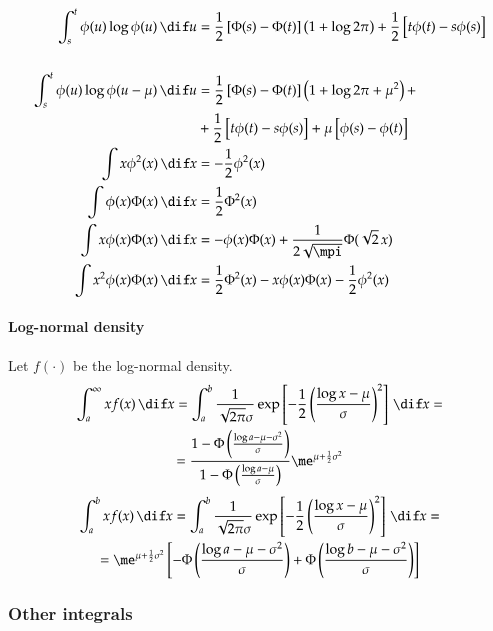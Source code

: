 \documentclass[a4paper]{article}
\numberwithin{equation}{subsection}
\begin{document}
\begin{align}
  \int_s^t \phi(u) \log\phi(u) \,\dif u 
  &=
  \frac{1}{2}\left[ \Phi(s) - \Phi(t)\right] \left(1+\log 2\pi \right)
  + \frac{1}{2}\left[ t\phi(t) - s\phi(s)\right] 
  \nonumber\\
  &\\
  \int_s^t \phi(u) \log\phi(u - \mu) \,\dif u 
  &=
  \frac{1}{2}\left[ \Phi(s) - \Phi(t)\right]
  \left( 1 + \log 2\pi + \mu^2 \right) + 
  \nonumber\\
  & + \frac{1}{2}\left[ t\phi(t) - s\phi(s)\right] +
  \mu \left[ \phi(s) - \phi(t) \right]\\
  \int x \phi^2(x) \,\dif x
  &=
  -\frac{1}{2} \phi^2(x)\\
  \int \phi(x) \Phi(x) \,\dif x
  &=
  \frac{1}{2} \Phi^2(x)\\
  \int x \phi(x) \Phi(x) \,\dif x
  &=
  -\phi(x) \Phi(x) + \frac{1}{2\sqrt{\mpi}} \Phi(\sqrt{2}\,x)\\
  \int x^2 \phi(x) \Phi(x) \,\dif x
  &=
  \frac{1}{2} \Phi^2(x)
  -x \phi(x) \Phi(x)
  -\frac{1}{2} \phi^2(x)
\end{align}


\paragraph{Log-normal density}

Let $f(\cdot)$ be the log-normal density.
\begin{multline}
\int_a^\infty x f(x) \,\dif x
  =
  \int_a^b
  \frac{1}{\sqrt{2\pi}\sigma}
  \exp\left[
    -\frac{1}{2}
    \left(
      \frac{\log x - \mu}{\sigma}
    \right)^2
  \right]
  \,\dif x
  =
  \\
  =
  \frac{1 - \Phi \left(
      \frac{\log a - \mu - \sigma^2}{\sigma}
      \right)}
    {1 - \Phi \left(
      \frac{\log a - \mu}{\sigma}
      \right)}
    \me^{\mu + \frac{1}{2}\sigma^2} 
\end{multline}
\begin{multline}
  \int_a^b x f(x) \,\dif x
  =
  \int_a^b
  \frac{1}{\sqrt{2\pi}\sigma}
  \exp\left[
    -\frac{1}{2}
    \left(
      \frac{\log x - \mu}{\sigma}
    \right)^2
  \right]
  \,\dif x
  =
  \\
  =
  \me^{\mu + \frac{1}{2}\sigma^2}
  \left[
    -\Phi \left(
      \frac{\log a - \mu - \sigma^2}{\sigma}
    \right)
    +\Phi \left(
      \frac{\log b - \mu - \sigma^2}{\sigma}
    \right)
  \right]
\end{multline}


\subsubsection{Other integrals}
\end{document}
